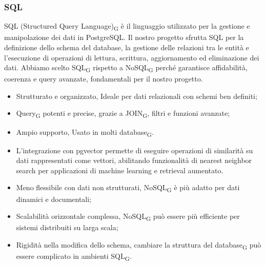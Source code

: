 \subsubsection{SQL}
SQL (Structured Query Language)\textsubscript{G} è il linguaggio utilizzato per la gestione e manipolazione dei dati in PostgreSQL. Il nostro progetto sfrutta SQL per la definizione dello schema del database, la gestione delle relazioni tra le entità e l’esecuzione di operazioni di lettura, scrittura, aggiornamento ed eliminazione dei dati. Abbiamo scelto SQL\textsubscript{G} rispetto a NoSQL\textsubscript{G} perché garantisce affidabilità, coerenza e query avanzate, fondamentali per il nostro progetto.
\begin{itemize}
    \item Strutturato e organizzato, Ideale per dati relazionali con schemi ben definiti;
    \item Query\textsubscript{G} potenti e precise, grazie a JOIN\textsubscript{G}, filtri e funzioni avanzate;
    \item Ampio supporto, Usato in molti database\textsubscript{G}.
    \item L’integrazione con pgvector permette di eseguire operazioni di similarità su dati rappresentati come vettori, abilitando funzionalità di nearest neighbor search per applicazioni di machine learning e retrieval aumentato.
\end{itemize}
\begin{itemize}
    \item Meno flessibile con dati non strutturati, NoSQL\textsubscript{G} è più adatto per dati dinamici e documentali;
    \item Scalabilità orizzontale complessa, NoSQL\textsubscript{G} può essere più efficiente per sistemi distribuiti su larga scala;
    \item Rigidità nella modifica dello schema, cambiare la struttura del database\textsubscript{G} può essere complicato in ambienti SQL\textsubscript{G}.
\end{itemize}

